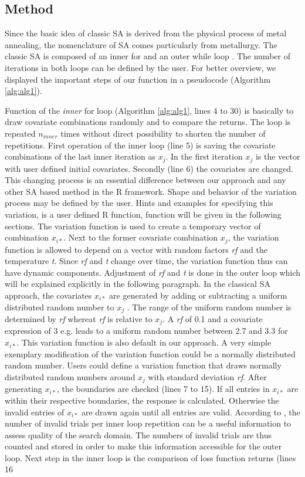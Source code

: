 \subsection{Method}
\label{subsec:method}
Since the basic idea of classic SA is derived from the physical process of metal annealing, the nomenclature of SA comes particularly from metallurgy. The classic SA is composed of an inner for and an outer while loop \citep{kirkpatrick_1983}. The number of iterations in both loops can be defined by the user. For better overview, we displayed the important steps of our function in a pseudocode (Algorithm \ref{alg:alg1}).

Function of the \emph{inner} for loop (Algorithm \ref{alg:alg1}, lines 4 to 30) is basically to draw covariate combinations randomly and to compare the returns. The loop is repeated $n_{inner}$ times without direct possibility to shorten the number of repetitions. First operation of the inner loop (line 5) is saving the covariate combinations of the last inner iteration as $x_j$. In the first iteration $x_j$ is the vector with user defined initial covariates. Secondly (line 6) the covariates are changed. This changing process is an essential difference between our approach and any other SA based method in the R framework. Shape and behavior of the variation process may be defined by the user. Hints and examples for specifying this variation, is a user defined R function, function will be given in the following sections. The variation function is used to create a temporary vector of combination $x_{i*}$. Next to the former covariate combination $x_j$, the variation function is allowed to depend on a vector with random factors \textit{rf} and the temperature \textit{t}. Since \textit{rf} and \textit{t} change over time, the variation function thus can have dynamic components. Adjustment of \textit{rf} and \textit{t} is done in the outer loop which will be explained explicitly in the following paragraph. In the classical SA approach, the covariates $x_{i*}$ are generated by adding or subtracting a uniform distributed random number to $x_j$ \citep{kirkpatrick_1983}. The range of the uniform random number is determined by \textit{rf} whereat \textit{rf} is relative to $x_j$. A \textit{rf} of 0.1 and a covariate expression of 3 e.g. leads to a uniform random number between 2.7 and 3.3 for $x_{i*}$. This variation function is also default in our approach. A very simple exemplary modification of the variation function could be a normally distributed random number. Users could define a variation function that draws normally distributed random numbers around $x_j$ with standard deviation \textit{rf}. After generating $x_{i*}$, the boundaries are checked (lines 7 to 15). If all entries in $x_{i*}$ are within their respective boundaries, the response is calculated. Otherwise the invalid entries of $x_{i*}$ are drawn again until all entries are valid. According to \citet{corana_1987}, the number of invalid trials per inner loop repetition can be a useful information to assess quality of the search domain. The numbers of invalid trials are thus counted and stored in order to make this information accessible for the outer loop. Next step in the inner loop is the comparison of loss function returns (lines 16 